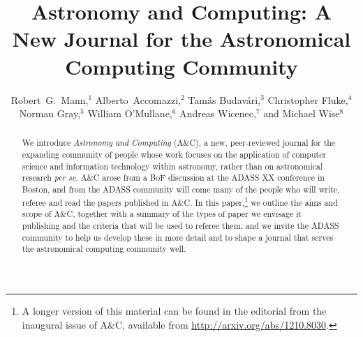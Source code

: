 
\resetcounters




\title{Astronomy and Computing: A New Journal for the Astronomical Computing Community}
\author{Robert~G.~Mann,$^1$ Alberto~Accomazzi,$^2$ Tam{\'a}s Budav{\'a}ri,$^3$ Christopher Fluke,$^4$ Norman Gray,$^5$ William O'Mullane,$^6$ Andreas Wicenec,$^7$ and Michael Wise$^8$\\
}


\begin{abstract}
We introduce {\em Astronomy and Computing\/} (A\&C), a new, peer-reviewed journal for the expanding community of people whose work focuses on the application of computer science and information technology within astronomy, rather than on astronomical research {\em per se\/}. A\&C arose from a BoF discussion at the ADASS XX conference in Boston, and from the ADASS community will come many of the people who will write, referee and read the papers published in A\&C. In this paper,\footnote{A longer version of this material can be found in the editorial from the inaugural issue of A\&C, available from \url{http://arxiv.org/abs/1210.8030}.} we outline the aims and scope of A\&C, together with a summary of the types of paper we envisage it publishing and the criteria that will be used to referee them, and we invite the ADASS community to help us develop these in more detail and to shape a journal that serves the astronomical computing community well.

\end{abstract}

